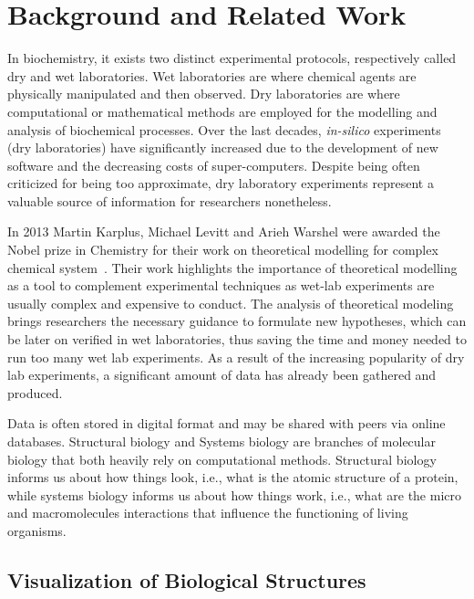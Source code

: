 \section{Background and Related Work}

In biochemistry, it exists two distinct experimental protocols, respectively called dry and wet laboratories.
Wet laboratories are where chemical agents are physically manipulated and then observed.
Dry laboratories are where computational or mathematical methods are employed for the modelling and analysis of biochemical processes. 
Over the last decades, \textit{in-silico} experiments (dry laboratories) have significantly increased due to the development of new software and the decreasing costs of super-computers.
Despite being often criticized for being too approximate, dry laboratory experiments represent a valuable source of information for researchers nonetheless.

In 2013 Martin Karplus, Michael Levitt and Arieh Warshel were awarded the Nobel prize in Chemistry for their work on theoretical modelling for complex chemical system~\cite{karplus2014development}.
Their work highlights the importance of theoretical modelling as a tool to complement experimental techniques as wet-lab experiments are usually complex and expensive to conduct.
The analysis of theoretical modeling brings researchers the necessary guidance to formulate new hypotheses, which can be later on verified in wet laboratories, thus saving the time and money needed to run too many wet lab experiments.
As a result of the increasing popularity of dry lab experiments, a significant amount of data has already been gathered and produced.

Data is often stored in digital format and may be shared with peers via online databases.
Structural biology and Systems biology are branches of molecular biology that both heavily rely on computational methods.
Structural biology informs us about how things look, i.e., what is the atomic structure of a protein, while systems biology informs us about how things work, i.e., what are the micro and macromolecules interactions that influence the functioning of living organisms.

\subsection{Visualization of Biological Structures}

